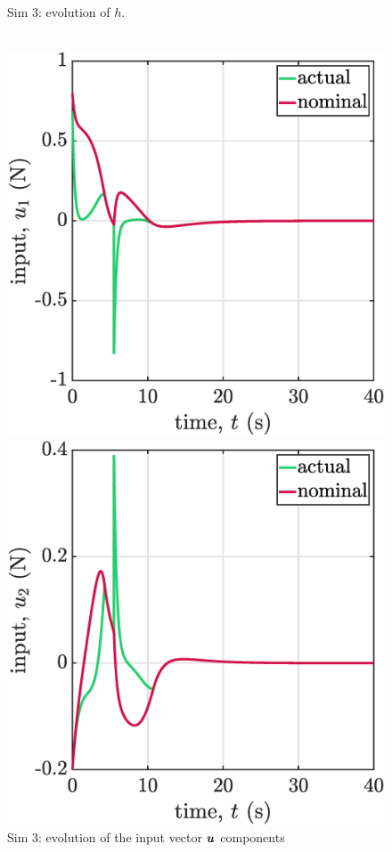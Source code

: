 \begin{figure}[!ht]
\begin{minipage}[b]{0.46\linewidth}
    \caption{\label{fig:sim3h}Sim 3: evolution of $h$.\\~}
    \end{minipage}
    \begin{minipage}[t]{.45\textwidth}
        \centering
        \includegraphics[width=\textwidth]{figures/sim3u1.eps}
    \end{minipage}
    \hfill
    \begin{minipage}[t]{.45\textwidth}
        \centering
        \includegraphics[width=\textwidth]{figures/sim3u2.eps}
    \end{minipage}
    \caption{\label{fig:sim3u} Sim 3: evolution of the input vector $\boldsymbol{u}$ components}

\end{figure}
